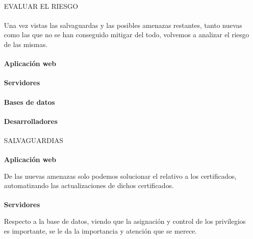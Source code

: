 \paragraph{}
EVALUAR EL RIESGO
\paragraph{}
Una vez vistas las salvaguardas y las posibles amenazas restantes,
tanto nuevas como las que no se han conseguido mitigar del todo,
volvemos a analizar el riesgo de las mismas.


\paragraph{}
\textbf{Aplicación web}

\paragraph{}
\textbf{Servidores}

\paragraph{}
\textbf{Bases de datos}

\paragraph{}
\textbf{Desarrolladores}

\paragraph{}
SALVAGUARDIAS

\paragraph{}
\textbf{Aplicación web}

De las nuevas amenazas solo podemos solucionar el relativo a los
certificados, automatizando las actualizaciones de dichos
certificados.
\paragraph{}
\textbf{Servidores}

Respecto a la base de datos, viendo que la asignación y control de los
privilegios es importante, se le da la importancia y atención que se
merece.
